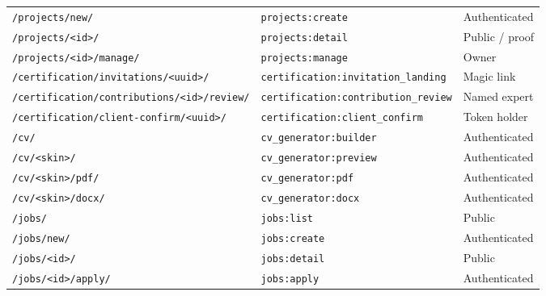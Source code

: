 \documentclass[11pt,a4paper]{article}
\begin{document}
\begin{center}
\begin{longtable}{@{}L{5.8cm}L{3.2cm}L{6.4cm}@{}}
  \texttt{/\allowbreak projects/\allowbreak new/\allowbreak } & \texttt{projects:\allowbreak create} & Authenticated \\
  \texttt{/\allowbreak projects/\allowbreak \textless id\textgreater\allowbreak /\allowbreak } & \texttt{projects:\allowbreak detail} & Public / proof \\
  \texttt{/\allowbreak projects/\allowbreak \textless id\textgreater\allowbreak /\allowbreak manage/\allowbreak } & \texttt{projects:\allowbreak manage} & Owner \\
  \texttt{/\allowbreak certification/\allowbreak invitations/\allowbreak \textless uuid\textgreater\allowbreak /\allowbreak } & \texttt{certification:\allowbreak invitation\_\allowbreak landing} & Magic link \\
  \texttt{/\allowbreak certification/\allowbreak contributions/\allowbreak \textless id\textgreater\allowbreak /\allowbreak review/\allowbreak } & \texttt{certification:\allowbreak contribution\_\allowbreak review} & Named expert \\
  \texttt{/\allowbreak certification/\allowbreak client-confirm/\allowbreak \textless uuid\textgreater\allowbreak /\allowbreak } & \texttt{certification:\allowbreak client\_\allowbreak confirm} & Token holder \\
  \texttt{/\allowbreak cv/\allowbreak } & \texttt{cv\_\allowbreak generator:\allowbreak builder} & Authenticated \\
  \texttt{/\allowbreak cv/\allowbreak \textless skin\textgreater\allowbreak /\allowbreak } & \texttt{cv\_\allowbreak generator:\allowbreak preview} & Authenticated \\
  \texttt{/\allowbreak cv/\allowbreak \textless skin\textgreater\allowbreak /\allowbreak pdf/\allowbreak } & \texttt{cv\_\allowbreak generator:\allowbreak pdf} & Authenticated \\
  \texttt{/\allowbreak cv/\allowbreak \textless skin\textgreater\allowbreak /\allowbreak docx/\allowbreak } & \texttt{cv\_\allowbreak generator:\allowbreak docx} & Authenticated \\
  \texttt{/\allowbreak jobs/\allowbreak } & \texttt{jobs:\allowbreak list} & Public \\
  \texttt{/\allowbreak jobs/\allowbreak new/\allowbreak } & \texttt{jobs:\allowbreak create} & Authenticated \\
  \texttt{/\allowbreak jobs/\allowbreak \textless id\textgreater\allowbreak /\allowbreak } & \texttt{jobs:\allowbreak detail} & Public \\
  \texttt{/\allowbreak jobs/\allowbreak \textless id\textgreater\allowbreak /\allowbreak apply/\allowbreak } & \texttt{jobs:\allowbreak apply} & Authenticated \\

\end{longtable}
\end{center}
\end{document}
